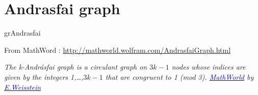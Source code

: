 \newpage\section{Andrasfai graph}
\begin{NewMacroBox}{grAndrasfai}{}

\medskip
From MathWord : \url{http://mathworld.wolfram.com/AndrasfaiGraph.html} 

\emph{The k-Andrásfai graph is a circulant graph on $3k-1$ nodes whose indices are given by the integers 1,\dots,$3k-1$  that are congruent to 1 (mod 3).
\href{http://mathworld.wolfram.com/topics/GraphTheory.html}%
           {\textcolor{blue}{MathWorld}} by \href{http://en.wikipedia.org/wiki/Eric_W._Weisstein}%
           {\textcolor{blue}{E.Weisstein}}
}

\medskip
\end{NewMacroBox}

\bigskip

\subsection{}

\bigskip
\begin{center}
\begin{tkzexample}[vbox]
\end{tkzexample} 
\end{center}

\vfill\newpage
\subsection{}

\bigskip\begin{center}
\begin{tkzexample}[vbox]
\end{tkzexample} 
\end{center}


\vfill\newpage
\subsection{}

\bigskip\begin{center}
\begin{tkzexample}[vbox]
\end{tkzexample}
\end{center}


\endinput
